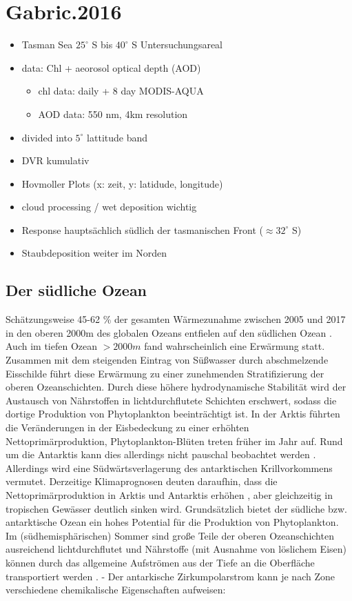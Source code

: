 \documentclass[12pt,a4paper,onecolumn]{scrartcl}
\begin{document}
\section{Gabric.2016}

\begin{itemize}
\item Tasman Sea $25^\circ$ S bis $40^\circ$ S Untersuchungsareal
\item data: Chl + aeorosol optical depth (AOD)
\begin{itemize}
\item chl data: daily + 8 day MODIS-AQUA
\item AOD data: 550 nm, 4km resolution
\end{itemize}
\item divided into $5^\circ$ lattitude band
\item DVR kumulativ
\item Hovmoller Plots (x: zeit, y: latidude, longitude)
\item cloud processing / wet deposition wichtig
\item Response hauptsächlich südlich der tasmanischen Front ($\approx 32^\circ$ S)
\item Staubdeposition weiter im Norden
\end{itemize}

\subsection{Der südliche Ozean}

Schätzungsweise 45-62 \% der gesamten Wärmezunahme zwischen 2005 und 2017 in den oberen 2000m des globalen Ozeans entfielen auf den südlichen Ozean \citep{IPCCpol.2019}. Auch im tiefen Ozean $>2000m$ fand wahrscheinlich eine Erwärmung statt. Zusammen mit dem steigenden Eintrag von Süßwasser durch abschmelzende Eisschilde führt diese Erwärmung zu  einer zunehmenden Stratifizierung der oberen Ozeanschichten. Durch diese höhere hydrodynamische Stabilität wird  der Austausch von Nährstoffen in lichtdurchflutete Schichten erschwert, sodass die dortige Produktion von Phytoplankton beeinträchtigt ist. In der Arktis führten die Veränderungen in der Eisbedeckung zu einer erhöhten Nettoprimärproduktion, Phytoplankton-Blüten treten früher im Jahr auf. Rund um die Antarktis kann dies allerdings nicht pauschal beobachtet werden \citep{IPCCpol.2019}. Allerdings wird eine Südwärtsverlagerung des antarktischen Krillvorkommens vermutet. Derzeitige Klimaprognosen deuten daraufhin, dass die Nettoprimärproduktion in Arktis und Antarktis erhöhen , aber gleichzeitig in tropischen Gewässer deutlich sinken wird. Grundsätzlich bietet der südliche bzw. antarktische Ozean ein hohes Potential für die Produktion von Phytoplankton. Im (südhemisphärischen) Sommer sind große Teile der oberen Ozeanschichten ausreichend lichtdurchflutet und Nährstoffe (mit Ausnahme von löslichem Eisen) können durch das allgemeine Aufströmen aus der Tiefe an die Oberfläche transportiert werden \citep{Martin.1990}. -  Der antarkische Zirkumpolarstrom kann je nach Zone verschiedene chemikalische Eigenschaften aufweisen:
\end{document}
